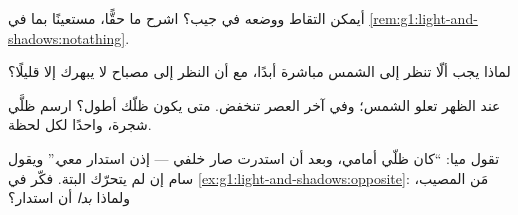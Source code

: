 \begin{exercise}[$\star$]\label{exo:g1:light-and-shadows:6}
أيمكن التقاط  ووضعه في جيب؟ اشرح ما  حقًّا، مستعينًا
بما في \cref{rem:g1:light-and-shadows:notathing}.
\end{exercise}

\begin{exercise}[$\star$]\label{exo:g1:light-and-shadows:7}
لماذا يجب ألّا تنظر إلى الشمس مباشرة أبدًا، مع أن النظر إلى مصباح
لا يبهرك إلا قليلًا؟
\end{exercise}

\begin{exercise}[$\star$]\label{exo:g1:light-and-shadows:8}
عند الظهر تعلو الشمس؛ وفي آخر العصر تنخفض. متى يكون ظلّك أطول؟
ارسم ظلَّي شجرة، واحدًا لكل لحظة.
\end{exercise}

\begin{exercise}[$\star\star$]\label{exo:g1:light-and-shadows:9}
تقول ميا: ``كان ظلّي أمامي، وبعد أن استدرت صار خلفي --- إذن
استدار  معي.'' ويقول سام إن  لم يتحرّك البتة. فكّر في
\cref{ex:g1:light-and-shadows:opposite}: مَن المصيب، ولماذا
\emph{بدا} أن  استدار؟
\end{exercise}
